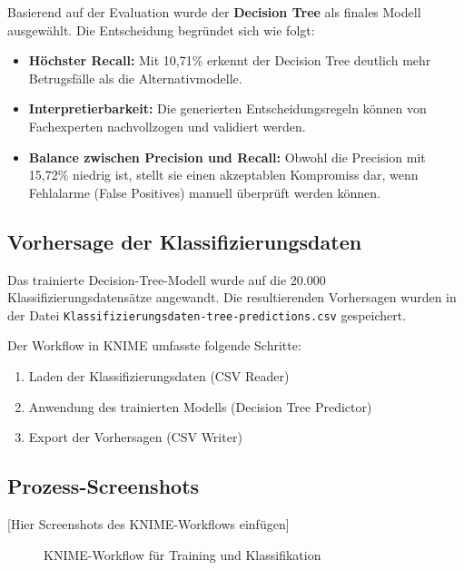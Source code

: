 Basierend auf der Evaluation wurde der \textbf{Decision Tree} als finales Modell 
ausgewählt. Die Entscheidung begründet sich wie folgt:

\begin{itemize}
    \item \textbf{Höchster Recall:} Mit 10,71\% erkennt der Decision Tree deutlich 
    mehr Betrugsfälle als die Alternativmodelle.
    \item \textbf{Interpretierbarkeit:} Die generierten Entscheidungsregeln können 
    von Fachexperten nachvollzogen und validiert werden.
    \item \textbf{Balance zwischen Precision und Recall:} Obwohl die Precision mit 
    15,72\% niedrig ist, stellt sie einen akzeptablen Kompromiss dar, wenn 
    Fehlalarme (False Positives) manuell überprüft werden können.
\end{itemize}

\subsection{Vorhersage der Klassifizierungsdaten}

Das trainierte Decision-Tree-Modell wurde auf die 20.000 Klassifizierungsdatensätze 
angewandt. Die resultierenden Vorhersagen wurden in der Datei 
\newline\texttt{Klassifizierungsdaten-tree-predictions.csv} gespeichert.

Der Workflow in KNIME umfasste folgende Schritte:
\begin{enumerate}
    \item Laden der Klassifizierungsdaten (CSV Reader)
    \item Anwendung des trainierten Modells (Decision Tree Predictor)
    \item Export der Vorhersagen (CSV Writer)
\end{enumerate}

\subsection{Prozess-Screenshots}

[Hier Screenshots des KNIME-Workflows einfügen]

\begin{figure}[h]
\centering
\caption{KNIME-Workflow für Training und Klassifikation}
\end{figure}


